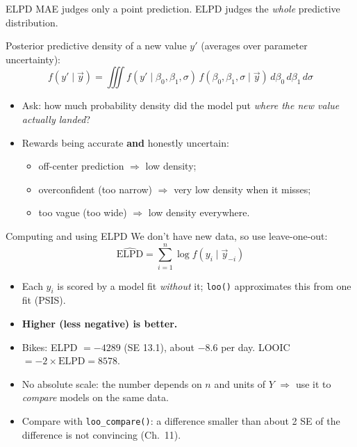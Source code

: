 \documentclass[aspectratio=43,11pt]{beamer}
\begin{document}
\begin{frame}{ELPD}
  MAE judges only a point prediction. ELPD judges the \emph{whole}
  predictive distribution.
  \vspace{0.4em}

  Posterior predictive density of a new value $y'$
  (averages over parameter uncertainty):
  \[
    f(y' \mid \vec{y}) = \iiint f(y' \mid \beta_0,\beta_1,\sigma)\,
    f(\beta_0,\beta_1,\sigma \mid \vec{y})\, d\beta_0\, d\beta_1\, d\sigma
  \]
  \begin{itemize}
    \item Ask: how much probability density did the model put
      \emph{where the new value actually landed}?
    \item Rewards being accurate \textbf{and} honestly uncertain:
      \begin{itemize}
        \item off-center prediction $\Rightarrow$ low density;
        \item overconfident (too narrow) $\Rightarrow$ very low density
          when it misses;
        \item too vague (too wide) $\Rightarrow$ low density everywhere.
      \end{itemize}
  \end{itemize}
\end{frame}

\begin{frame}{Computing and using ELPD}
  We don't have new data, so use leave-one-out:
  \[
    \widehat{\text{ELPD}} = \sum_{i=1}^{n} \log f(y_i \mid \vec y_{-i})
  \]
  \begin{itemize}
    \item Each $y_i$ is scored by a model fit \emph{without} it;
      \texttt{loo()} approximates this from one fit (PSIS).
    \item \textbf{Higher (less negative) is better.}
    \item Bikes: ELPD $= -4289$ (SE 13.1), about $-8.6$ per day.
      LOOIC $= -2 \times \text{ELPD} = 8578$.
    \item No absolute scale: the number depends on $n$ and units of $Y$
      $\Rightarrow$ use it to \emph{compare} models on the same data.
    \item Compare with \texttt{loo\_compare()}: a difference smaller than
      about 2 SE of the difference is not convincing (Ch.\ 11).
  \end{itemize}
\end{frame}
\end{document}

